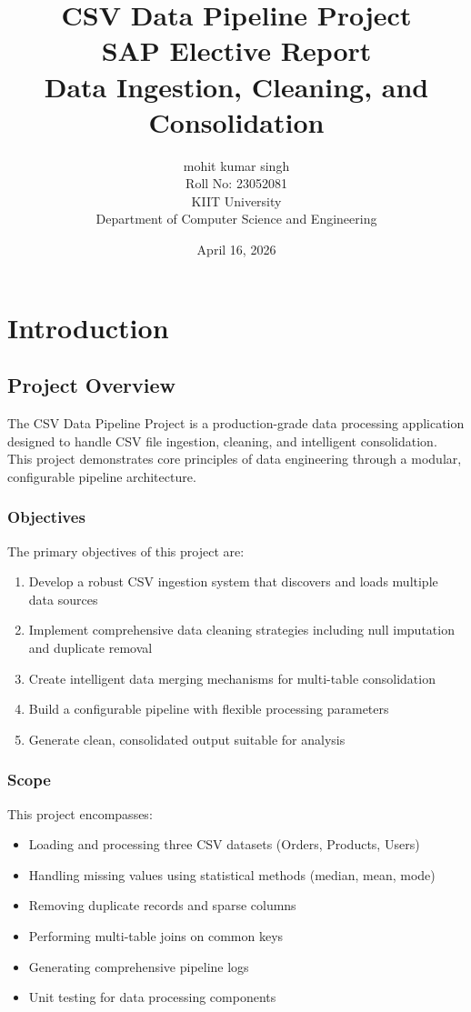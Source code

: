 \documentclass[12pt,a4paper]{report}
\title{
    \textbf{CSV Data Pipeline Project} \\
    \vspace{0.5cm}
    \large SAP Elective Report \\
    \vspace{0.3cm}
    \normalsize Data Ingestion, Cleaning, and Consolidation
}
\author{
    mohit kumar singh \\
    Roll No: 23052081 \\
    KIIT University \\
    Department of Computer Science and Engineering
}
\date{April 16, 2026}
\begin{document}
\maketitle

\newpage
\tableofcontents
\newpage

\chapter{Introduction}

\section{Project Overview}

The CSV Data Pipeline Project is a production-grade data processing application designed to handle CSV file ingestion, cleaning, and intelligent consolidation. This project demonstrates core principles of data engineering through a modular, configurable pipeline architecture.

\subsection{Objectives}

The primary objectives of this project are:
\begin{enumerate}
    \item Develop a robust CSV ingestion system that discovers and loads multiple data sources
    \item Implement comprehensive data cleaning strategies including null imputation and duplicate removal
    \item Create intelligent data merging mechanisms for multi-table consolidation
    \item Build a configurable pipeline with flexible processing parameters
    \item Generate clean, consolidated output suitable for analysis
\end{enumerate}

\subsection{Scope}

This project encompasses:
\begin{itemize}
    \item Loading and processing three CSV datasets (Orders, Products, Users)
    \item Handling missing values using statistical methods (median, mean, mode)
    \item Removing duplicate records and sparse columns
    \item Performing multi-table joins on common keys
    \item Generating comprehensive pipeline logs
    \item Unit testing for data processing components
\end{itemize}
\end{document}
